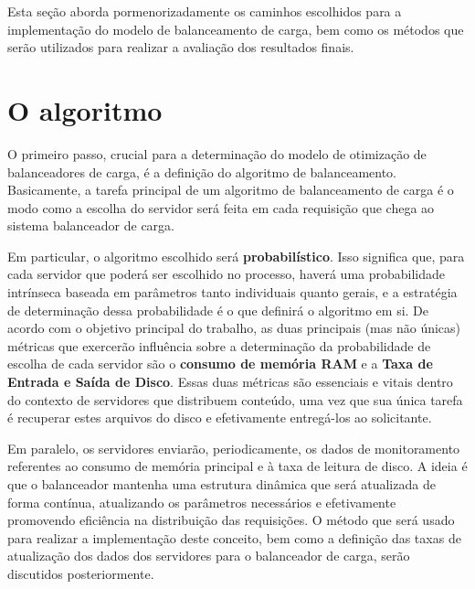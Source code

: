


Esta seção aborda pormenorizadamente os caminhos escolhidos para a implementação do modelo de balanceamento de carga, bem como os métodos que serão utilizados para realizar a avaliação dos resultados finais.

\section{O algoritmo}

O primeiro passo, crucial para a determinação do modelo de otimização de balanceadores de carga, é a definição do algoritmo de balanceamento. Basicamente, a tarefa principal de um algoritmo de balanceamento de carga é o modo como a escolha do servidor será feita em cada requisição que chega ao sistema balanceador de carga.

Em particular, o algoritmo escolhido será \textbf{probabilístico}. Isso significa que, para cada servidor que poderá ser escolhido no processo, haverá uma probabilidade intrínseca baseada em parâmetros tanto individuais quanto gerais, e a estratégia de determinação dessa probabilidade é o que definirá o algoritmo em si. De acordo com o objetivo principal do trabalho, as duas principais (mas não únicas) métricas que exercerão influência sobre a determinação da probabilidade de escolha de cada servidor são o \textbf{consumo de memória RAM} e a \textbf{Taxa de Entrada e Saída de Disco}. Essas duas métricas são essenciais e vitais dentro do contexto de servidores que distribuem conteúdo, uma vez que sua única tarefa é recuperar estes arquivos do disco e efetivamente entregá-los ao solicitante. 

Em paralelo, os servidores enviarão, periodicamente, os dados de monitoramento referentes ao consumo de memória principal e à taxa de leitura de disco. A ideia é que o balanceador mantenha uma estrutura dinâmica que será atualizada de forma contínua, atualizando os parâmetros necessários e efetivamente promovendo eficiência na distribuição das requisições. O método que será usado para realizar a implementação deste conceito, bem como a definição das taxas de atualização dos dados dos servidores para o balanceador de carga, serão discutidos posteriormente.

